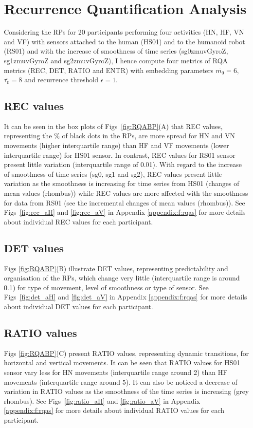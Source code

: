 \newpage
\section{Recurrence Quantification Analysis} \label{ch6:rqas}
Considering the RPs for 20 participants performing four activities 
(HN, HF, VN and VF) with sensors attached to the human (HS01) and to the 
humanoid robot (RS01) and with the increase of smoothness of time series 
(sg0zmuvGyroZ, sg1zmuvGyroZ and sg2zmuvGyroZ), 
I hence compute four metrics of RQA metrics (REC, DET, RATIO and ENTR) with 
embedding parameters $\overline{m_0}=6$, $\overline{\tau_0}=8$ and 
recurrence threshold $\epsilon=1$.
 
\subsection*{REC values}
It can be seen in the box plots of Figs~\ref{fig:RQABP}(A) that REC values, 
representing the \% of black dots in the RPs, 
are more spread for HN and VN movements (higher interquartile range) 
than HF and VF movements (lower interquartile range) for HS01 sensor. 
In contrast, REC values for RS01 sensor present little variation 
(interquartile range of 0.01).
With regard to the increase of smoothness of time series 
(sg0, sg1 and sg2), REC values present little 
variation as the smoothness is increasing for time series from HS01 
(changes of mean values (rhombus)) while REC values are more affected with 
the smoothness for data from RS01 
(see the incremental changes of mean values (rhombus)).
See Figs~\ref{fig:rec_aH} and \ref{fig:rec_aV} in Appendix \ref{appendix:f:rqas} 
for more details about individual REC values for each participant.

\subsection*{DET values}
Figs \ref{fig:RQABP}(B) illustrate DET values, 
representing predictability and organisation of the RPs, 
which change very little (interquartile range is around 0.1) 
for type of movement, level of smoothness or type of sensor.
See Figs~\ref{fig:det_aH} and \ref{fig:det_aV} in Appendix \ref{appendix:f:rqas} 
for more details about individual DET values for each participant.

\subsection*{RATIO values}
Figs \ref{fig:RQABP}(C) present RATIO values, representing dynamic transitions, 
for horizontal and vertical movements.
It can be seen that RATIO values for HS01 sensor vary less 
for HN movements (interquartile range around 2)
than HF movements (interquartile range around 5).
It can also be noticed a decrease of variation in RATIO values as the 
smoothness of the time series is increasing (grey rhombus).
See Figs~\ref{fig:ratio_aH} and \ref{fig:ratio_aV} in Appendix 
\ref{appendix:f:rqas} 
for more details about individual RATIO values for each participant.

